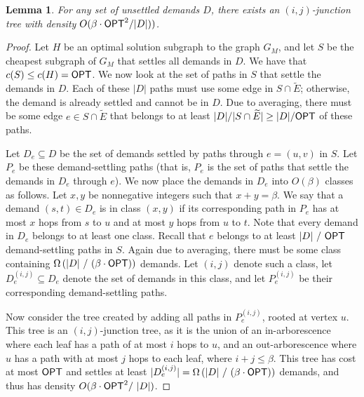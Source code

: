 \documentclass{article}
\newtheorem{lemma}[theorem]{Lemma}
\theoremstyle{definition}
\theoremstyle{remark}
\def\opt {{\sf OPT}}
\begin{document}
\begin{lemma}
\label{lem:existence}
    For any set of unsettled demands $D$, there exists an $(i,j)$-junction tree with density $O(\beta \cdot {{\opt}}^2 / |D|) )$.
\end{lemma}
\begin{proof}
    Let $H$ be an optimal solution subgraph to the graph $G_M$, and let $S$ be the cheapest subgraph of $G_M$ that settles all demands in $D$.
    We have that $c(S) \leq c(H) = {\opt}$.
We now look at the set of paths in $S$ that settle the demands in $D$. Each of these $|D|$ paths must use some edge in $S \cap \widetilde{E}$; otherwise, the demand is already settled and cannot be in $D$. Due to averaging, there must be some edge $e \in S \cap \widetilde{E}$ that belongs to at least $|D| / |S \cap \widetilde{E}| \geq |D| / {\opt}$ of these paths. 
    
    Let $D_e \subseteq D$ be the set of demands settled by paths through $e = (u,v)$ in $S$. Let $P_{e}$ be these demand-settling paths (that is, $P_{e}$ is the set of paths that settle the demands in $D_e$ through $e$). 
    We now place the demands in $D_e$ into $O(\beta)$ classes as follows. Let $x,y$ be nonnegative integers such that $x+y = \beta$. We say that a demand $(s,t) \in D_e$ is in class $(x,y)$ if its corresponding path in $P_{e}$ has at most $x$ hops from $s$ to $u$ and at most $y$ hops from $u$ to $t$. Note that every demand in $D_e$ belongs to at least one class. Recall that $e$ belongs to at least $|D| \mbox{ } / \mbox{ } {\opt}$ demand-settling paths in $S$.
    Again due to averaging, there must be some class containing $\Omega\left( |D| \mbox{ } / \mbox{ } (\beta \cdot {\opt}) \right)$ demands. Let $(i,j)$ denote such a class, let $D_e^{(i,j)} \subseteq D_e$ denote the set of demands in this class, and let $P_e^{(i,j)}$ be their corresponding demand-settling paths. 

    Now consider the tree created by adding all paths in $P_{e}^{(i,j)}$, rooted at vertex $u$. This tree is an $(i, j)$-junction tree, as it is the union of an in-arborescence where each leaf has a path of at most $i$ hops to $u$, and an out-arborescence where $u$ has a path with at most $j$ hops to each leaf, where $i+j \leq \beta$. This tree has cost at most ${\opt}$ and settles at least $|D_e^{(i,j)}| = \Omega \left( |D| \mbox{ } / \mbox{ } (\beta \cdot {\opt}) \right)$ demands, and thus has density $O( \beta \cdot {{\opt}}^2 / \mbox{ } |D| )$.
\end{proof}
\end{document}
